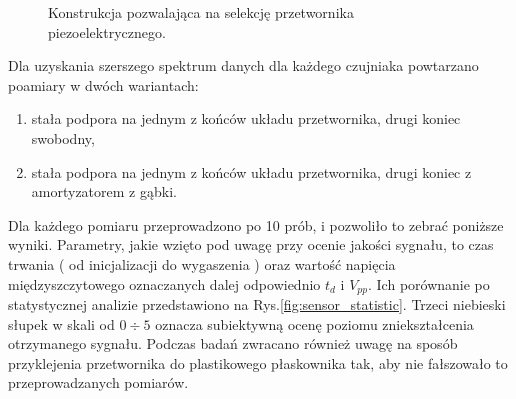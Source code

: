 \begin{figure}[htbp]
\centering
{}%
\caption{Konstrukcja pozwalająca na selekcję przetwornika piezoelektrycznego.}
\label{fig:sensor_sel_geometry}
\end{figure}

Dla uzyskania szerszego spektrum danych dla każdego czujniaka powtarzano poamiary w dwóch wariantach: 
\begin{enumerate}
\item stała podpora na jednym z końców układu przetwornika, drugi koniec swobodny,
\item stała podpora na jednym z końców układu przetwornika, drugi koniec z amortyzatorem z gąbki.
\end{enumerate}
Dla każdego pomiaru przeprowadzono po 10 prób, i pozwoliło to zebrać poniższe wyniki. Parametry, jakie wzięto pod uwagę przy ocenie jakości sygnału, to czas trwania ( od inicjalizacji do wygaszenia ) oraz wartość napięcia międzyszczytowego oznaczanych dalej odpowiednio $t_d$ i $V_{pp}$. Ich porównanie po statystycznej analizie przedstawiono na Rys.\ref{fig:sensor_statistic}. Trzeci niebieski słupek w skali od $0\div5$ oznacza subiektywną ocenę poziomu zniekształcenia otrzymanego sygnału. Podczas badań zwracano również uwagę na sposób przyklejenia przetwornika do plastikowego płaskownika tak, aby nie fałszowało to przeprowadzanych pomiarów. 



